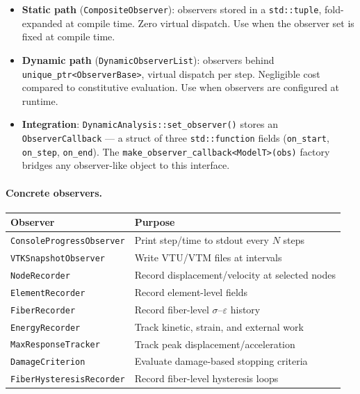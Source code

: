 \begin{itemize}[nosep]
  \item \textbf{Static path} (\texttt{CompositeObserver}): observers stored in
        a \texttt{std::tuple}, fold-expanded at compile time.  Zero virtual
        dispatch.  Use when the observer set is fixed at compile time.

  \item \textbf{Dynamic path} (\texttt{DynamicObserverList}): observers behind
        \texttt{unique\_ptr<ObserverBase>}, virtual dispatch per step.
        Negligible cost compared to constitutive evaluation.  Use when
        observers are configured at runtime.

  \item \textbf{Integration}: \texttt{DynamicAnalysis::set\_observer()} stores
        an \texttt{ObserverCallback} --- a struct of three
        \texttt{std::function} fields (\texttt{on\_start}, \texttt{on\_step},
        \texttt{on\_end}).  The \texttt{make\_observer\_callback<ModelT>(obs)}
        factory bridges any observer-like object to this interface.
\end{itemize}

\paragraph{Concrete observers.}

\begin{center}
\small
\begin{tabular}{@{}lp{8cm}@{}}
\toprule
\textbf{Observer} & \textbf{Purpose} \\
\midrule
\texttt{ConsoleProgressObserver} & Print step/time to stdout every $N$ steps \\
\texttt{VTKSnapshotObserver}     & Write VTU/VTM files at intervals \\
\texttt{NodeRecorder}            & Record displacement/velocity at selected nodes \\
\texttt{ElementRecorder}         & Record element-level fields \\
\texttt{FiberRecorder}           & Record fiber-level $\sigma$--$\varepsilon$ history \\
\texttt{EnergyRecorder}          & Track kinetic, strain, and external work \\
\texttt{MaxResponseTracker}      & Track peak displacement/acceleration \\
\texttt{DamageCriterion}         & Evaluate damage-based stopping criteria \\
\texttt{FiberHysteresisRecorder} & Record fiber-level hysteresis loops \\
\bottomrule
\end{tabular}
\end{center}


